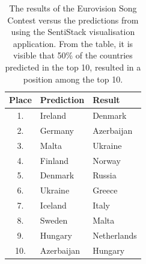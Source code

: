 \begin{table}

\centering
\begin{tabular}{|c|l|l|} 
\hline
 Place	&  Prediction	& Result  \\ \hline \hline

1. & Ireland & Denmark      \\ \hline
2. & Germany & Azerbaijan   \\ \hline
3. & Malta & Ukraine      \\ \hline
4. & Finland & Norway       \\ \hline
5. & Denmark & Russia       \\ \hline
6. & Ukraine & Greece       \\ \hline
7. & Iceland & Italy        \\ \hline
8. & Sweden & Malta        \\ \hline
9. & Hungary & Netherlands  \\ \hline
10. & Azerbaijan & Hungary  \\ \hline

\end{tabular}

\caption[Eurovision Song Contest experiment result]{The results of the Eurovision Song Contest versus the predictions from using the SentiStack visualisation application. From the table, it is visible that 50\% of the countries predicted in the top 10, resulted in a position among the top 10.}
\label{tab:esc_results}
\end{table}
